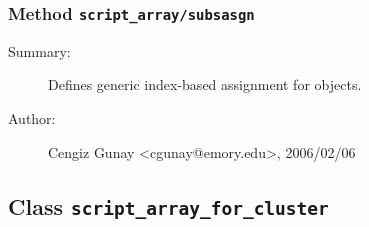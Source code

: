 \subsubsection[Method \texttt{subsasgn}]{Method \texttt{script\_array/subsasgn}}%
%
\label{ref_script_array__subsasgn}%
\hypertarget{ref_script_array__subsasgn}{}%
\begin{description}
\item[Summary:]Defines generic index-based assignment for objects.
%
%
%
%
%
%
%
\item[Author:]%
Cengiz Gunay <cgunay@emory.edu>, 2006/02/06%
\end{description}
\methodline%
\subsection{Class \texttt{script\_array\_for\_cluster}}%
%
\label{ref_script_array_for_cluster}%
\hypertarget{ref_script_array_for_cluster}{}%
